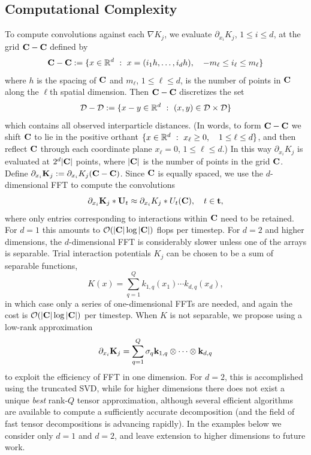 \documentclass[english,reqno]{amsart}
\begin{document}
\subsection{Computational Complexity}\label{sec:compcomp}

To compute convolutions against each $\nabla K_j$, we evaluate $\partial_{x_i} K_j$, $1\leq i\leq d$, at the grid $\mathbf{C}-\mathbf{C}$ defined by 
\[\mathbf{C}-\mathbf{C}:=\{x\in \mathbb{R}^d\ :\ x =(i_1h,\dots, i_dh), \quad -m_\ell\leq i_\ell\leq m_\ell\}\]
where $h$ is the spacing of $\mathbf{C}$ and $m_\ell$, $1\leq \ell\leq d$, is the number of points in $\mathbf{C}$ along the $\ell$th spatial dimension. Then $\mathbf{C}-\mathbf{C}$ discretizes the set 
\[{\mathcal{D}}-{\mathcal{D}}:=\{x-y\in \mathbb{R}^d\ :\ (x,y)\in {\mathcal{D}}\times {\mathcal{D}}\}\]
which contains all observed interparticle distances. (In words, to form $\mathbf{C}-\mathbf{C}$ we shift $\mathbf{C}$ to lie in the positive orthant $\{x\in \mathbb{R}^d\ :\ x_\ell\geq 0, \quad 1\leq\ell\leq d\}$, and then reflect $\mathbf{C}$ through each coordinate plane $x_\ell=0$, $1\leq\ell\leq d$.) In this way $\partial_{x_i}K_j$ is evaluated at $2^d|\mathbf{C}|$ points, where $|\mathbf{C}|$ is the number of points in the grid $\mathbf{C}$. Define $\partial_{x_i}\mathbf{K}_j := \partial_{x_i}K_j(\mathbf{C}-\mathbf{C})$. Since $\mathbf{C}$ is equally spaced, we use the $d$-dimensional FFT to compute the convolutions
\[ \partial_{x_i}\mathbf{K}_j * \mathbf{U}_t \approx \partial_{x_i}K_j*U_t(\mathbf{C}), \quad t\in \mathbf{t},\]
where only entries corresponding to interactions within $\mathbf{C}$ need to be retained. For $d=1$ this amounts to ${\mathcal{O}}(|\mathbf{C}|\log|\mathbf{C}|)$ flops per timestep. For $d=2$ and higher dimensions, the $d$-dimensional FFT is considerably slower unless one of the arrays is separable. Trial interaction potentials $K_j$ can be chosen to be a sum of separable functions,
\[K(x) = \sum_{q=1}^Q k_{1,q}(x_1)\cdots k_{d,q}(x_d),\]
in which case only a series of one-dimensional FFTs are needed, and again the cost is ${\mathcal{O}}(|\mathbf{C}|\log|\mathbf{C}|)$ per timestep. When $K$ is not separable, we propose using a low-rank approximation 
\[\partial_{x_i}\mathbf{K}_j = \sum_{q=1}^Q\sigma_{q} \mathbf{k}_{1,q}\otimes \cdots \otimes \mathbf{k}_{d,q}\]
to exploit the efficiency of FFT in one dimension. For $d=2$, this is accomplished using the truncated SVD, while for higher dimensions there does not exist a unique {\it best} rank-$Q$ tensor approximation, although several efficient algorithms are available to compute a sufficiently accurate decomposition \cite{malik2018low,sun2020low,jang2020d} (and the field of fast tensor decompositions is advancing rapidly). In the examples below we consider only $d=1$ and $d=2$, and leave extension to higher dimensions to future work.\\
\end{document}
